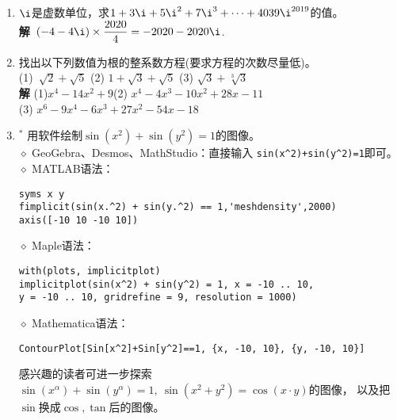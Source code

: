 \begin{enumerate}[label={\textbf{\arabic*.}},leftmargin=
    \inteval{\myenumleftmargin}pt]
\item $ \i $是虚数单位，求$ 1+3\i+5\i^2+7\i^3+\cdots +4039\i^{2019} $的值。
\ifteach \\ \textbf{解}\ 
$ (-4-4\i)\times \dfrac{2020}{4}=-2020-2020\i $. 
\fi

\item 找出以下列数值为根的整系数方程(要求方程的次数尽量低)。\\
(1)\ $ \sqrt{2}+\sqrt{5} $ \quad (2) $ 1+\sqrt{3}+\sqrt{5} $ \quad (3) 
$ \sqrt{3}+\sqrt[3]{3} $ 
\\
\textbf{解} (1)$ x^4-14x^2+9 $\quad (2) $ x^4-4x^3-10x^2+28x-11 $ \\
(3) $ x^6-9x^4-6x^3+27x^2-54x-18 $

\item$ ^* $ 用软件绘制$ \sin(x^2)+\sin(y^2)=1 $的图像。\\
$\diamond$ GeoGebra、Desmos、MathStudio：直接输入
\verb|sin(x^2)+sin(y^2)=1|即可。\\
$\diamond$ MATLAB语法：
\begin{lstlisting}
syms x y
fimplicit(sin(x.^2) + sin(y.^2) == 1,'meshdensity',2000)
axis([-10 10 -10 10])    
\end{lstlisting} 
$\diamond$ Maple语法：
\begin{lstlisting}
with(plots, implicitplot)
implicitplot(sin(x^2) + sin(y^2) = 1, x = -10 .. 10, 
y = -10 .. 10, gridrefine = 9, resolution = 1000)    
\end{lstlisting} 
$\diamond$ Mathematica语法：
\begin{lstlisting}
ContourPlot[Sin[x^2]+Sin[y^2]==1, {x, -10, 10}, {y, -10, 10}]    
\end{lstlisting} 

感兴趣的读者可进一步探索$ \sin(x^{\alpha})+\sin(y^{\alpha})=1,\ 
\sin\left(x^{2}+y^{2}\right)=\cos\left(x\cdot y\right) $的图像，
以及把$ \sin $换成$ \cos,\tan $后的图像。

\end{enumerate}

%
%
%
%
%

\myfootnote{\CopyrightStatementChap}
\cleardoublepage




